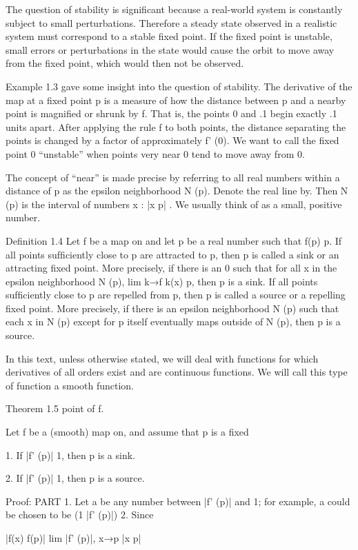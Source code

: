 \documentclass[12pt]{article}
\begin{document}
The question of stability is signiﬁcant because a real-world system is constantly subject to small 
perturbations. Therefore a steady state observed in a realistic system must correspond to a stable ﬁxed 
point. If the ﬁxed point is unstable, small errors or perturbations in the state would cause the orbit to 
move away from the ﬁxed point, which would then not be observed.

Example 1.3 gave some insight into the question of stability. The derivative of the map at a ﬁxed point p 
is a measure of how the distance between p and a nearby point is magniﬁed or shrunk by f. That is, the 
points 0 and .1 begin exactly .1 units apart. After applying the rule f to both points, the distance 
separating the points is changed by a factor of approximately f' (0). We want to call the ﬁxed point 0 
“unstable” when points very near 0 tend to move away from 0.

The concept of “near” is made precise by referring to all real numbers within a distance  of p as the 
epsilon neighborhood N  (p). Denote the real line by. Then N  (p) is the interval of numbers x  : |x  p|     
. We usually think of  as a small, positive number.

Deﬁnition 1.4 Let f be a map on and let p be a real number such that f(p)  p. If all points sufﬁciently 
close to p are attracted to p, then p is called a
sink or an attracting ﬁxed point. More precisely, if there is an    0 such that for all x in the epsilon 
neighborhood N  (p), lim k→f k(x)  p, then p is a sink. If all points sufﬁciently close to p are repelled 
from p, then p is called a source or a repelling ﬁxed point. More precisely, if there is an epsilon 
neighborhood N  (p) such that each x in N  (p) except for p itself eventually maps outside of N  (p), then 
p is a source.

In this text, unless otherwise stated, we will deal with functions for which derivatives of all orders 
exist and are continuous functions. We will call this type of function a smooth function.

Theorem 1.5 point of f.

Let f be a (smooth) map on, and assume that p is a ﬁxed

1. If |f' (p)|   1, then p is a sink.

2. If |f' (p)| 
 1, then p is a source.

Proof: PART 1. Let a be any number between |f' (p)| and 1; for example, a could be chosen to be (1 |f' 
(p)|)  2. Since

|f(x)  f(p)| lim  |f' (p)|, x→p |x  p|
\end{document}
